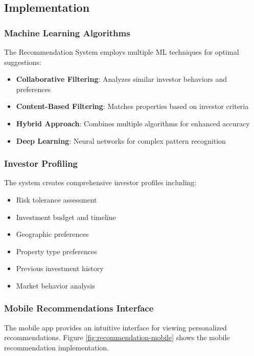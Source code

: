 \subsection{Implementation}
\subsubsection{Machine Learning Algorithms}
The Recommendation System employs multiple ML techniques for optimal suggestions:

\begin{itemize}
    \item \textbf{Collaborative Filtering}: Analyzes similar investor behaviors and preferences
    \item \textbf{Content-Based Filtering}: Matches properties based on investor criteria
    \item \textbf{Hybrid Approach}: Combines multiple algorithms for enhanced accuracy
    \item \textbf{Deep Learning}: Neural networks for complex pattern recognition
\end{itemize}

\subsubsection{Investor Profiling}
The system creates comprehensive investor profiles including:
\begin{itemize}
    \item Risk tolerance assessment
    \item Investment budget and timeline
    \item Geographic preferences
    \item Property type preferences
    \item Previous investment history
    \item Market behavior analysis
\end{itemize}

\subsubsection{Mobile Recommendations Interface}
The mobile app provides an intuitive interface for viewing personalized recommendations. Figure \ref{fig:recommendation-mobile} shows the mobile recommendation implementation.

